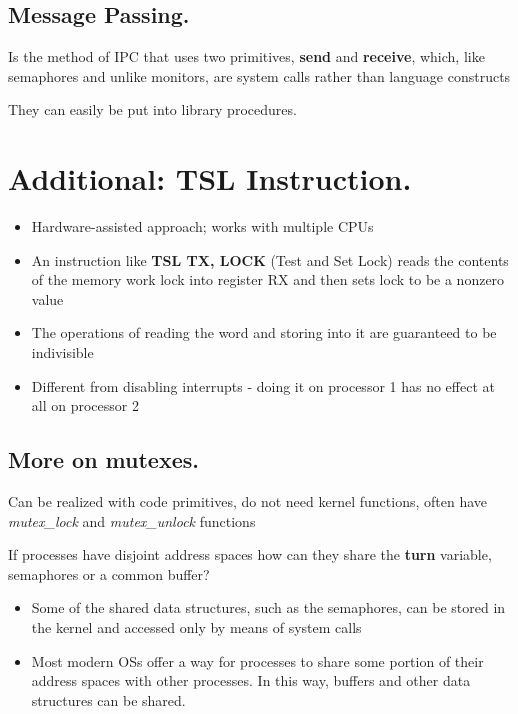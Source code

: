\documentclass{article}
\begin{document}
\subsection*{Message Passing.}
\noindent

Is the method of IPC that uses two primitives, \textbf{send} and \textbf{receive}, which, like semaphores and unlike monitors, are system calls rather than language constructs

They can easily be put into library procedures.

\section*{Additional: TSL Instruction.}

\begin{itemize}
  \item Hardware-assisted approach; works with multiple CPUs
  \item An instruction like \textbf{TSL TX, LOCK} (Test and Set Lock) reads the contents of the memory work lock into register RX and then sets lock to be a nonzero value
  \item The operations of reading the word and storing into it are guaranteed to be indivisible
  \item Different from disabling interrupts - doing it on processor 1 has no effect at all on processor 2
\end{itemize}

\subsection*{More on mutexes.}

Can be realized with code primitives, do not need kernel functions, often have \textit{mutex\_lock} and \textit{mutex\_unlock} functions

If processes have disjoint address spaces how can they share the \textbf{turn} variable, semaphores or a common buffer? 

\begin{itemize}
  \item Some of the shared data structures, such as the semaphores, can be stored in the kernel and accessed only by means of system calls
  \item Most modern OSs offer a way for processes to share some portion of their address spaces with other processes. In this way, buffers and other data structures can be shared.
\end{itemize}
\end{document}
